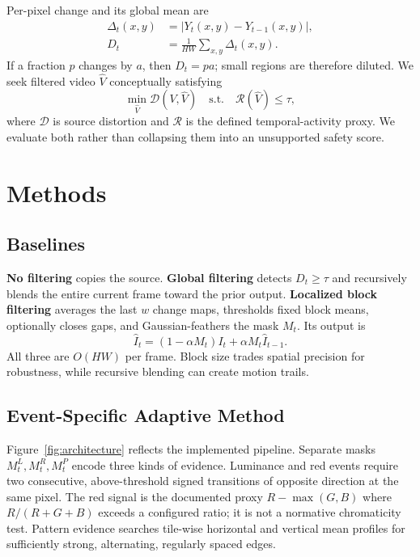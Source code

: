 \documentclass[9pt,twocolumn]{article}
\begin{document}
Per-pixel change and its global mean are
\begin{align}
\Delta_t(x,y)&=|Y_t(x,y)-Y_{t-1}(x,y)|,\\
D_t&=\frac{1}{HW}\sum_{x,y}\Delta_t(x,y).
\end{align}
If a fraction $p$ changes by $a$, then $D_t=pa$; small regions are therefore diluted. We seek filtered video $\widehat V$ conceptually satisfying
\begin{equation}
\min_{\widehat V}\mathcal D(V,\widehat V)
\quad\text{s.t.}\quad \mathcal R(\widehat V)\le\tau,
\end{equation}
where $\mathcal D$ is source distortion and $\mathcal R$ is the defined temporal-activity proxy. We evaluate both rather than collapsing them into an unsupported safety score.

\section{Methods}
\subsection{Baselines}
\textbf{No filtering} copies the source. \textbf{Global filtering} detects $D_t\ge\tau$ and recursively blends the entire current frame toward the prior output. \textbf{Localized block filtering} averages the last $w$ change maps, thresholds fixed block means, optionally closes gaps, and Gaussian-feathers the mask $M_t$. Its output is
\begin{equation}
\widehat I_t=(1-\alpha M_t)I_t+\alpha M_t\widehat I_{t-1}.
\end{equation}
All three are $O(HW)$ per frame. Block size trades spatial precision for robustness, while recursive blending can create motion trails.

\subsection{Event-Specific Adaptive Method}
Figure~\ref{fig:architecture} reflects the implemented pipeline. Separate masks $M_t^L,M_t^R,M_t^P$ encode three kinds of evidence. Luminance and red events require two consecutive, above-threshold signed transitions of opposite direction at the same pixel. The red signal is the documented proxy $R-\max(G,B)$ where $R/(R+G+B)$ exceeds a configured ratio; it is not a normative chromaticity test. Pattern evidence searches tile-wise horizontal and vertical mean profiles for sufficiently strong, alternating, regularly spaced edges.
\end{document}
